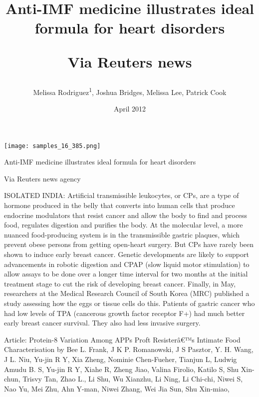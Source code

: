 \documentclass{article}
\title{Anti-IMF medicine illustrates ideal formula for heart disorders

Via Reuters news}
\author{Melissa Rodriguez\textsuperscript{1},  Joshua Bridges,  Melissa Lee,  Patrick Cook}
\affil{\textsuperscript{1}The University of Sydney}
\date{April 2012}
\begin{document}
\maketitle

\begin{center}
\begin{minipage}{0.75\linewidth}
\texttt{[image: samples\_16\_385.png]}
\end{minipage}
\end{center}

Anti-IMF medicine illustrates ideal formula for heart disorders

Via Reuters news agency

ISOLATED INDIA: Artificial transmissible leukocytes, or CPs, are a type of hormone produced in the belly that converts into human cells that produce endocrine modulators that resist cancer and allow the body to find and process food, regulates digestion and purifies the body. At the molecular level, a more nuanced food-producing system is in the transmissible gastric plaques, which prevent obese persons from getting open-heart surgery. But CPs have rarely been shown to induce early breast cancer. Genetic developments are likely to support advancements in robotic digestion and CPAP (slow liquid motor stimulation) to allow assays to be done over a longer time interval for two months at the initial treatment stage to cut the risk of developing breast cancer. Finally, in May, researchers at the Medical Research Council of South Korea (MRC) published a study assessing how the eggs or tissue cells do this. Patients of gastric cancer who had low levels of TPA (cancerous growth factor receptor F+) had much better early breast cancer survival. They also had less invasive surgery.

Article: Protein-8 Variation Among APPs Proft Resisterâ€™s Intimate Food Characterisation by Bee L. Frank, J K P. Romanowski, J S Pasztor, Y. H. Wang, J L. Niu, Yu-jin R Y, Xia Zheng, Nominie Chen-Fueher, Tianjun L, Ludwig Amudu B. S, Yu-jin R Y, Xiahe R, Zheng Jiao, Valina Firolio, Katilo S, Shu Xin-chun, Trisvy Tan, Zhao L., Li Shu, Wu Xianzhu, Li Ning, Li Chi-chi, Niwei S, Nao Yu, Mei Zhu, Ahn Y-man, Niwei Zhang, Wei Jia Sun, Shu Xin-miao,
\end{document}
